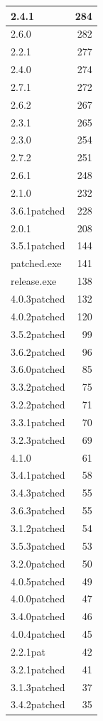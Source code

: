 \documentclass[
]{book}
\begin{document}
\begin{table}
\begin{tabular}[t]{l|r}
\hline
2.4.1 & 284\\
\hline
2.6.0 & 282\\
\hline
2.2.1 & 277\\
\hline
2.4.0 & 274\\
\hline
2.7.1 & 272\\
\hline
2.6.2 & 267\\
\hline
2.3.1 & 265\\
\hline
2.3.0 & 254\\
\hline
2.7.2 & 251\\
\hline
2.6.1 & 248\\
\hline
2.1.0 & 232\\
\hline
3.6.1patched & 228\\
\hline
2.0.1 & 208\\
\hline
3.5.1patched & 144\\
\hline
patched.exe & 141\\
\hline
release.exe & 138\\
\hline
4.0.3patched & 132\\
\hline
4.0.2patched & 120\\
\hline
3.5.2patched & 99\\
\hline
3.6.2patched & 96\\
\hline
3.6.0patched & 85\\
\hline
3.3.2patched & 75\\
\hline
3.2.2patched & 71\\
\hline
3.3.1patched & 70\\
\hline
3.2.3patched & 69\\
\hline
4.1.0 & 61\\
\hline
3.4.1patched & 58\\
\hline
3.4.3patched & 55\\
\hline
3.6.3patched & 55\\
\hline
3.1.2patched & 54\\
\hline
3.5.3patched & 53\\
\hline
3.2.0patched & 50\\
\hline
4.0.5patched & 49\\
\hline
4.0.0patched & 47\\
\hline
3.4.0patched & 46\\
\hline
4.0.4patched & 45\\
\hline
2.2.1pat & 42\\
\hline
3.2.1patched & 41\\
\hline
3.1.3patched & 37\\
\hline
3.4.2patched & 35\\

\end{tabular}
\end{table}
\end{document}
